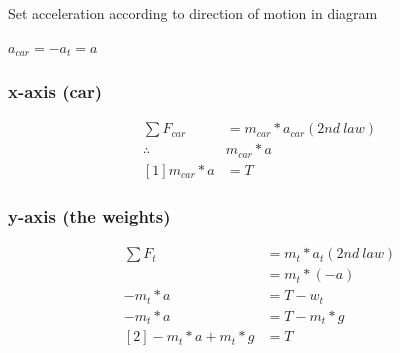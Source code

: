\documentclass[12pt]{article}
\begin{document}
\begin{figure}[H]
\end{figure}

Set acceleration according to direction of motion in diagram
\begin{center}
$a_{car} = -a_{t} = a$
\end{center}

\subsubsection{x-axis (car)}
\begin{align*}
\sum{F_{car}} 		& = m_{car} * a_{car}	(2nd\ law) \\
\therefore 			& m_{car} * a \\
[1] m_{car} * a 			& = T
\end{align*}

\subsubsection{y-axis (the weights)}
\begin{align*}
\sum{F_{t}} 		& = m_{t} * a_{t}	(2nd\ law) \\
				& = m_{t} * (-a) \\
-m_{t}*a 		& = T - w_{t} \\
-m_{t}*a 		& = T - m_{t}*g \\
[2] -m_{t}*a + m_{t}* g		& = T
\end{align*}
\end{document}
